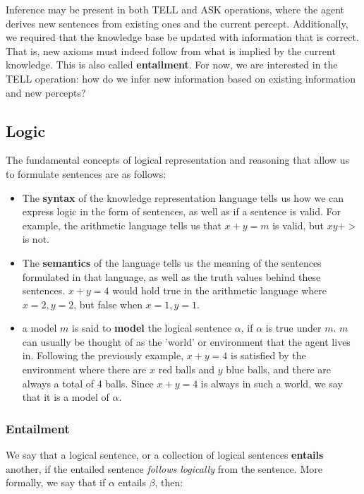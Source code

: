 \documentclass[12pt]{article}
\begin{document}
Inference may be present in both \textsc{TELL} and \textsc{ASK} operations, where the agent derives new sentences from existing ones and the current percept. Additionally, we required that the knowledge base be updated with information that is correct. That is, new axioms must indeed follow from what is implied by the current knowledge. This is also called \textbf{entailment}. For now, we are interested in the \textsc{TELL} operation: how do we infer new information based on existing information and new percepts?

\subsection{Logic}

The fundamental concepts of logical representation and reasoning that allow us to formulate sentences are as follows:

\begin{itemize}
\item The \textbf{syntax} of the knowledge representation language tells us how we can express logic in the form of sentences, as well as if a sentence is valid. For example, the arithmetic language tells us that $x + y = m$ is valid, but $x y +>$ is not.
\item The \textbf{semantics} of the language tells us the meaning of the sentences formulated in that language, as well as the truth values behind these sentences. $x+y=4$ would hold true in the arithmetic language where $x=2, y=2$, but false when $x=1, y=1$.
\item a model $m$ is said to \textbf{model} the logical sentence $\alpha$, if $\alpha$ is true under $m$. $m$ can usually be thought of as the 'world' or environment that the agent lives in. Following the previously example, $x + y = 4$ is satisfied by the environment where there are $x$ red balls and $y$ blue balls, and there are always a total of 4 balls. Since $x + y =4$ is always in such a world, we say that it is a model of $\alpha$.
\end{itemize}

\subsubsection{Entailment}

We say that a logical sentence, or a collection of logical sentences \textbf{entails} another, if the entailed sentence \textit{follows logically} from the sentence. More formally, we say that if $\alpha$ entails $\beta$, then:
\end{document}
